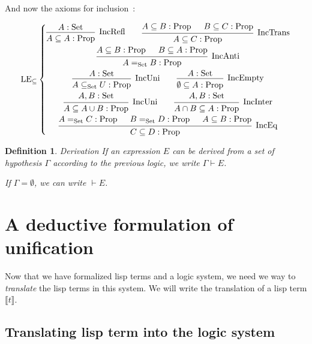 \documentclass[]{article}
\newcommand{\sem}[1]{\llbracket #1 \rrbracket}
\newcommand{\1}{\mathbbm{1}}
\newcommand{\0}{\mathbbm{0}}
\newtheorem{defi}{Definition}
\newcommand{\Prop}{\text{Prop}}
\newcommand{\Set}{\text{Set}}
\newcommand{\proof}[1]{{\scantokens{\begin{prooftree}#1\end{prooftree}}}}
\renewcommand{\subset}{\subseteq}
\begin{document}
And now the axioms for inclusion~:

\[\text{LE}_\subset\left\{
    \begin{gathered}
        \proof{
            \hypo{A:\Set}
            \infer1[IncRefl]{A\subset A : \Prop}
        }
        \qquad\proof{
            \hypo{A\subset B : \Prop}
            \hypo{B\subset C : \Prop}
            \infer2[IncTrans]{A\subset C:\Prop}
        }\\
        \proof{
            \hypo{A\subset B : \Prop}
            \hypo{B\subset A : \Prop}
            \infer2[IncAnti]{A =_\Set B : \Prop}
        }\\
        \proof{
            \hypo{A : \Set}
            \infer1[IncUni]{A\subset_\Set U : \Prop}
        }
        \qquad\proof{
            \hypo{A : \Set}
            \infer1[IncEmpty]{\emptyset\subset A : \Prop}
        }\\
        \proof{
            \hypo{A, B : \Set}
            \infer1[IncUni]{A \subset A\cup B : \Prop}
        }
        \qquad\proof{
            \hypo{A, B : \Set}
            \infer1[IncInter]{A\cap B\subset A : \Prop}
        }\\
        \proof{
            \hypo{A=_\Set C : \Prop}
            \hypo{B=_\Set D : \Prop}
            \hypo{A \subset B : \Prop}
            \infer3[IncEq]{C\subset D : \Prop}
        }
    \end{gathered}
\right.\]

\begin{defi}{Derivation}
    If an expression $E$ can be derived from a set of hypothesis $\Gamma$
    according to the previous logic, we write $\Gamma\vdash E$.

    If $\Gamma = \emptyset$, we can write $\vdash E$.
\end{defi}

\section{A deductive formulation of unification}

Now that we have formalized lisp terms and a logic system, we need we way to
\emph{translate} the lisp terms in this system. We will write the translation
of a lisp term $\sem{t}$.

\subsection{Translating lisp term into the logic system}
\end{document}
